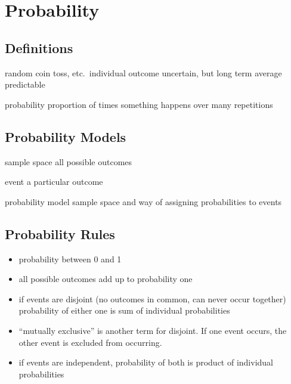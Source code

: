 \documentclass[letterpaper, landscape]{exam}
\begin{document}
  \section{Probability}

  \subsection{Definitions}

  \begin{description*}
    \item[random] coin toss, etc.\ individual outcome uncertain, but long term
      average predictable

    \item[probability] proportion of times something happens over many
      repetitions

  \end{description*}

  \subsection{Probability Models}

  \begin{description*}
    \item[sample space] all possible outcomes

    \item[event] a particular outcome

    \item[probability model] sample space and way of assigning probabilities to
      events

  \end{description*}

  \subsection{Probability Rules}

  \begin{itemize}
    \item probability between 0 and 1
    \item all possible outcomes add up to probability one
    \item if events are disjoint (no outcomes in common, can never occur
      together) probability of either one is sum of individual probabilities
    \item ``mutually exclusive'' is another term for disjoint. If one event
      occurs, the other event is excluded from occurring.
    \item if events are independent, probability of both is product of
      individual probabilities
  \end{itemize}
\end{document}
